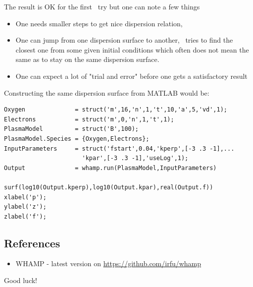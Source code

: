 \documentclass[a4,10pt]{article}
\begin{document}
The result is OK for the first \WHAMP\ try but one can note a few things
\begin{itemize}
    \item One needs smaller steps to get nice dispersion relation,
    \item One can jump from one dispersion surface to another, \WHAMP\ tries to find the closest one from some given initial conditions which often does not mean the same as to stay on the same dispersion surface.
    \item One can expect a lot of "trial and error" before one gets a satisfactory result
   \end{itemize}

Constructing the same dispersion surface from MATLAB would be: 
\begin{verbatim}
Oxygen              = struct('m',16,'n',1,'t',10,'a',5,'vd',1);
Electrons           = struct('m',0,'n',1,'t',1);
PlasmaModel         = struct('B',100);
PlasmaModel.Species = {Oxygen,Electrons};
InputParameters     = struct('fstart',0.04,'kperp',[-3 .3 -1],...
                      'kpar',[-3 .3 -1],'useLog',1);
Output              = whamp.run(PlasmaModel,InputParameters)

surf(log10(Output.kperp),log10(Output.kpar),real(Output.f))
xlabel('p');
ylabel('z');
zlabel('f');
\end{verbatim}

%


\subsection{References}
\begin{itemize}
\item WHAMP - latest version on \url{https://github.com/irfu/whamp}
\end{itemize}
\vspace{2cm}

\centering
Good luck!
\end{document}
